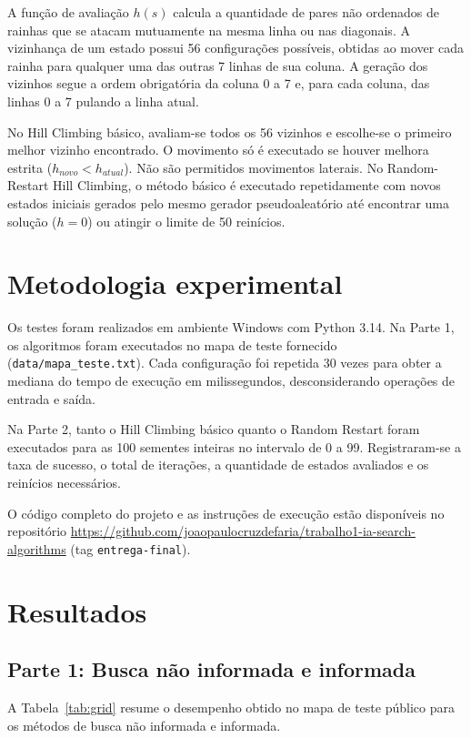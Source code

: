 \documentclass[12pt]{article}
\begin{document}
A função de avaliação $h(s)$ calcula a quantidade de pares não ordenados de rainhas que se atacam mutuamente na mesma linha ou nas diagonais. A vizinhança de um estado possui 56 configurações possíveis, obtidas ao mover cada rainha para qualquer uma das outras 7 linhas de sua coluna. A geração dos vizinhos segue a ordem obrigatória da coluna 0 a 7 e, para cada coluna, das linhas 0 a 7 pulando a linha atual.

No Hill Climbing básico, avaliam-se todos os 56 vizinhos e escolhe-se o primeiro melhor vizinho encontrado. O movimento só é executado se houver melhora estrita ($h_{novo} < h_{atual}$). Não são permitidos movimentos laterais. No Random-Restart Hill Climbing, o método básico é executado repetidamente com novos estados iniciais gerados pelo mesmo gerador pseudoaleatório até encontrar uma solução ($h=0$) ou atingir o limite de 50 reinícios.

\section{Metodologia experimental}
Os testes foram realizados em ambiente Windows com Python 3.14. Na Parte 1, os algoritmos foram executados no mapa de teste fornecido (\texttt{data/mapa\_teste.txt}). Cada configuração foi repetida 30 vezes para obter a mediana do tempo de execução em milissegundos, desconsiderando operações de entrada e saída.

Na Parte 2, tanto o Hill Climbing básico quanto o Random Restart foram executados para as 100 sementes inteiras no intervalo de 0 a 99. Registraram-se a taxa de sucesso, o total de iterações, a quantidade de estados avaliados e os reinícios necessários.

O código completo do projeto e as instruções de execução estão disponíveis no repositório \url{https://github.com/joaopaulocruzdefaria/trabalho1-ia-search-algorithms} (tag \texttt{entrega-final}).

\section{Resultados}

\subsection{Parte 1: Busca não informada e informada}
A Tabela~\ref{tab:grid} resume o desempenho obtido no mapa de teste público para os métodos de busca não informada e informada.
\end{document}
